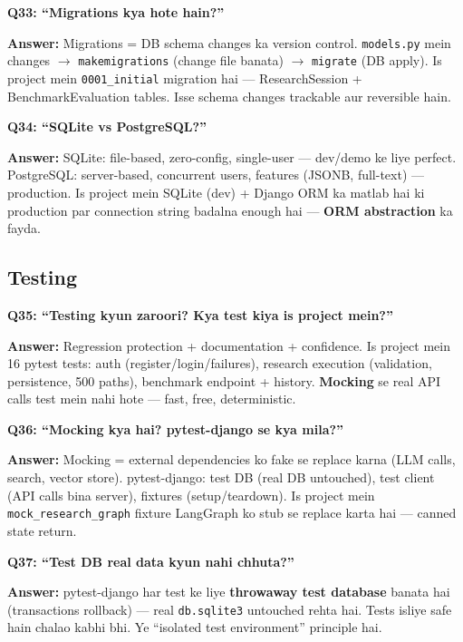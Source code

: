 \begin{interviewbox}
\textbf{Q33: ``Migrations kya hote hain?''}

\textbf{Answer:} Migrations = DB schema changes ka version control. \texttt{models.py} mein changes $\rightarrow$ \texttt{makemigrations} (change file banata) $\rightarrow$ \texttt{migrate} (DB apply). Is project mein \texttt{0001\_initial} migration hai --- ResearchSession + BenchmarkEvaluation tables. Isse schema changes trackable aur reversible hain.
\end{interviewbox}

\begin{interviewbox}
\textbf{Q34: ``SQLite vs PostgreSQL?''}

\textbf{Answer:} SQLite: file-based, zero-config, single-user --- dev/demo ke liye perfect. PostgreSQL: server-based, concurrent users, features (JSONB, full-text) --- production. Is project mein SQLite (dev) + Django ORM ka matlab hai ki production par connection string badalna enough hai --- \textbf{ORM abstraction} ka fayda.
\end{interviewbox}

\subsection{Testing}

\begin{interviewbox}
\textbf{Q35: ``Testing kyun zaroori? Kya test kiya is project mein?''}

\textbf{Answer:} Regression protection + documentation + confidence. Is project mein 16 pytest tests: auth (register/login/failures), research execution (validation, persistence, 500 paths), benchmark endpoint + history. \textbf{Mocking} se real API calls test mein nahi hote --- fast, free, deterministic.
\end{interviewbox}

\begin{interviewbox}
\textbf{Q36: ``Mocking kya hai? pytest-django se kya mila?''}

\textbf{Answer:} Mocking = external dependencies ko fake se replace karna (LLM calls, search, vector store). pytest-django: test DB (real DB untouched), test client (API calls bina server), fixtures (setup/teardown). Is project mein \texttt{mock\_research\_graph} fixture LangGraph ko stub se replace karta hai --- canned state return.
\end{interviewbox}

\begin{interviewbox}
\textbf{Q37: ``Test DB real data kyun nahi chhuta?''}

\textbf{Answer:} pytest-django har test ke liye \textbf{throwaway test database} banata hai (transactions rollback) --- real \texttt{db.sqlite3} untouched rehta hai. Tests isliye safe hain chalao kabhi bhi. Ye ``isolated test environment'' principle hai.
\end{interviewbox}

